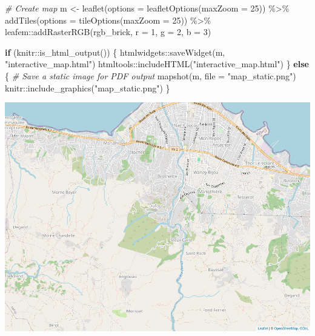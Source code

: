\documentclass[
]{article}
\newenvironment{Shaded}{\begin{snugshade}}{\end{snugshade}}
\newcommand{\AttributeTok}[1]{\textcolor[rgb]{0.77,0.63,0.00}{#1}}
\newcommand{\CommentTok}[1]{\textcolor[rgb]{0.56,0.35,0.01}{\textit{#1}}}
\newcommand{\ControlFlowTok}[1]{\textcolor[rgb]{0.13,0.29,0.53}{\textbf{#1}}}
\newcommand{\DecValTok}[1]{\textcolor[rgb]{0.00,0.00,0.81}{#1}}
\newcommand{\FunctionTok}[1]{\textcolor[rgb]{0.00,0.00,0.00}{#1}}
\newcommand{\NormalTok}[1]{#1}
\newcommand{\OtherTok}[1]{\textcolor[rgb]{0.56,0.35,0.01}{#1}}
\newcommand{\SpecialCharTok}[1]{\textcolor[rgb]{0.00,0.00,0.00}{#1}}
\newcommand{\StringTok}[1]{\textcolor[rgb]{0.31,0.60,0.02}{#1}}
\begin{document}
\begin{Shaded}
\begin{Highlighting}[]
\CommentTok{\# Create map}
\NormalTok{m }\OtherTok{\textless{}{-}} \FunctionTok{leaflet}\NormalTok{(}\AttributeTok{options =} \FunctionTok{leafletOptions}\NormalTok{(}\AttributeTok{maxZoom =} \DecValTok{25}\NormalTok{)) }\SpecialCharTok{\%\textgreater{}\%}
  \FunctionTok{addTiles}\NormalTok{(}\AttributeTok{options =} \FunctionTok{tileOptions}\NormalTok{(}\AttributeTok{maxZoom =} \DecValTok{25}\NormalTok{)) }\SpecialCharTok{\%\textgreater{}\%}
\NormalTok{  leafem}\SpecialCharTok{::}\FunctionTok{addRasterRGB}\NormalTok{(rgb\_brick, }\AttributeTok{r =} \DecValTok{1}\NormalTok{, }\AttributeTok{g =} \DecValTok{2}\NormalTok{, }\AttributeTok{b =} \DecValTok{3}\NormalTok{)}

\ControlFlowTok{if}\NormalTok{ (knitr}\SpecialCharTok{::}\FunctionTok{is\_html\_output}\NormalTok{()) \{}
\NormalTok{  htmlwidgets}\SpecialCharTok{::}\FunctionTok{saveWidget}\NormalTok{(m, }\StringTok{"interactive\_map.html"}\NormalTok{)}
\NormalTok{  htmltools}\SpecialCharTok{::}\FunctionTok{includeHTML}\NormalTok{(}\StringTok{"interactive\_map.html"}\NormalTok{)}
\NormalTok{\} }\ControlFlowTok{else}\NormalTok{ \{}
  \CommentTok{\# Save a static image for PDF output}
  \FunctionTok{mapshot}\NormalTok{(m, }\AttributeTok{file =} \StringTok{"map\_static.png"}\NormalTok{)}
\NormalTok{  knitr}\SpecialCharTok{::}\FunctionTok{include\_graphics}\NormalTok{(}\StringTok{"map\_static.png"}\NormalTok{)}
\NormalTok{\}}
\end{Highlighting}
\end{Shaded}

\begin{center}\includegraphics[width=13.78in]{map_static} \end{center}
\end{document}
